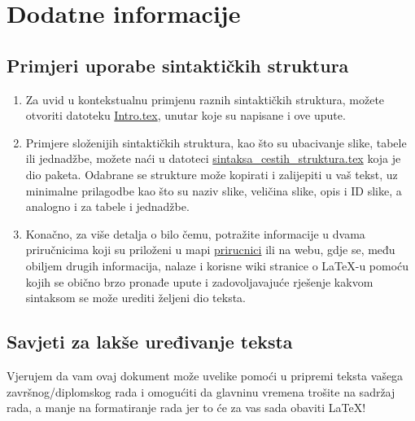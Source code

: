 \chapter{Dodatne informacije}
\section{Primjeri uporabe sintaktičkih struktura}
\begin{enumerate}
	\item Za uvid u kontekstualnu primjenu raznih sintaktičkih struktura, možete otvoriti datoteku \href{run:Intro.tex}{{\color{blue}Intro.tex}}, unutar koje su napisane i ove upute. 
	\item Primjere složenijih sintaktičkih struktura, kao što su ubacivanje slike, tabele ili jednadžbe, možete naći u datoteci \href{run:sintaksa_cestih_struktura.tex}{{\color{blue}sintaksa\_cestih\_struktura.tex}} koja je dio paketa. Odabrane se strukture može kopirati i zalijepiti u vaš tekst, uz minimalne prilagodbe kao što su naziv slike, veličina slike, opis i ID slike, a analogno i za tabele i jednadžbe.
	\item Konačno, za više detalja o bilo čemu, potražite informacije u dvama priručnicima koji su priloženi u mapi \href{run:prirucnici}{{\color{blue}prirucnici}} ili na webu, gdje se, među obiljem drugih informacija, nalaze i korisne wiki stranice \cite{latex_wiki,tex_exchange} o \LaTeX-u pomoću kojih se obično brzo pronađe upute i zadovoljavajuće rješenje kakvom sintaksom se može urediti željeni dio teksta.
\end{enumerate}

\section{Savjeti za lakše uređivanje teksta}
Vjerujem da vam ovaj dokument može uvelike pomoći u pripremi teksta vašega završnog/diplomskog rada i omogućiti da glavninu vremena trošite na sadržaj rada, a manje na formatiranje rada jer to će za vas sada obaviti \LaTeX{}! 

